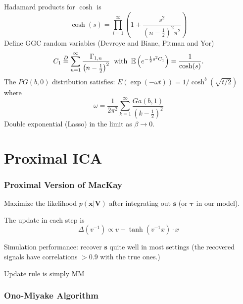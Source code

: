\documentclass{beamer}
\newcommand{\bcol}[1]{{\color{blue}{#1}}}
\newcommand{\half}{ {\scriptstyle \frac{1}{2} }  }
\begin{document}
\begin{frame}
\begin{center}
\bcol{ $ \cosh^{1/\beta} ( s ) $ extension}
\end{center}
\footnotesize

Hadamard products for $ \cosh $ is 
$$
\cosh (s) = \prod_{i=1}^\infty \left ( 1 + \frac{s^2}{(n-\half)^2 \pi^2} \right )
$$
Define GGC random variables (Devroye and Biane, Pitman and Yor)
$$
C_1  \stackrel{D}{=}  \sum_{n=1}^\infty \frac{ \Gamma_{1,n} }{ \left ( n - \frac{1}{2} \right )^2 }  \; \; {\rm with} \; \; \mathbb{E} \left ( e^{ - \half s^2 C_1 } \right ) = \frac{1}{ \cosh  (s) } .
$$
The $ PG(b,0) $ distribution satisfies: $ E ( \exp( - \omega t ) ) = 1 / \cosh^b ( \sqrt{ t / 2} ) $ where
$$
\omega = \frac{1}{2 \pi^2 } \sum_{k=1}^\infty \frac{ Ga(b,1 ) }{ ( k - \half )^2 } 
$$
Double exponential (Lasso) in the limit as $ \beta  \rightarrow 0 $.



\end{frame}
\section{Proximal ICA}



\begin{frame}
\frametitle{Proximal Version of MacKay}
\footnotesize

Maximize the likelihood $p(\bm{x} | \bm{V})$ after integrating out $\bm{s}$ (or $\bm{\tau}$ in our model).

\vspace{0.2in}
The update in each step is 
$$
\Delta (v^{-1}) \propto v - \tanh(v^{-1}x)\cdot x
$$

Simulation performance: recover $\bm{s}$ quite well in most settings (the recovered signals have correlations $>0.9$ with the true ones.)

\vspace{0.1in} 

Update rule is simply MM 
\end{frame}

\begin{frame}
\frametitle{Ono-Miyake Algorithm}
\footnotesize


\end{frame}
\end{document}
